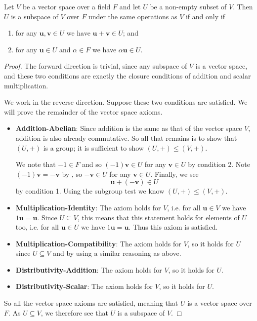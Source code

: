\begin{theorem}\label{thrm-subspace-test}
    Let $V$ be a vector space over a field $F$ and let $U$ be a non-empty subset of $V$. Then $U$ is a subspace of $V$ over $F$ under the same operations as $V$ if and only if
    \begin{enumerate}
        \item for any $\textbf{u}, \textbf{v} \in U$ we have $\textbf{u} + \textbf{v} \in U$; and
        \item for any $\textbf{u} \in U$ and $\alpha \in F$ we have $\alpha\textbf{u} \in U$.
    \end{enumerate}
\end{theorem}
\begin{proof}
    The forward direction is trivial, since any subspace of $V$ is a vector space, and these two conditions are exactly the closure conditions of addition and scalar multiplication.

    We work in the reverse direction. Suppose these two conditions are satisfied. We will prove the remainder of the vector space axioms.
    \begin{itemize}
        \item \textbf{Addition-Abelian}: Since addition is the same as that of the vector space $V$, addition is also already commutative. So all that remains is to show that $(U, +)$ is a group; it is sufficient to show $(U, +) \leq (V, +)$.

        We note that $-1 \in F$ and so $(-1)\textbf{v} \in U$ for any $\textbf{v} \in U$ by condition 2. Note $(-1)\textbf{v} = -\textbf{v}$ by , so $-\textbf{v} \in U$ for any $\textbf{v} \in U$. Finally, we see
        \[
            \textbf{u} + (-\textbf{v}) \in U
        \]
        by condition 1. Using the subgroup test we know $(U, +) \leq (V, +)$.

        \item \textbf{Multiplication-Identity}: The axiom holds for $V$, i.e. for all $\textbf{u} \in V$ we have $1\textbf{u} = \textbf{u}$. Since $U \subseteq V$, this means that this statement holds for elements of $U$ too, i.e. for all $\textbf{u} \in U$ we have $1\textbf{u} = \textbf{u}$. Thus this axiom is satisfied.

        \item \textbf{Multiplication-Compatibility}: The axiom holds for $V$, so it holds for $U$ since $U \subseteq V$ and by using a similar reasoning as above.

        \item \textbf{Distributivity-Addition}: The axiom holds for $V$, so it holds for $U$.

        \item \textbf{Distributivity-Scalar}: The axiom holds for $V$, so it holds for $U$.
    \end{itemize}
    So all the vector space axioms are satisfied, meaning that $U$ is a vector space over $F$. As $U \subseteq V$, we therefore see that $U$ is a subspace of $V$.
\end{proof}
